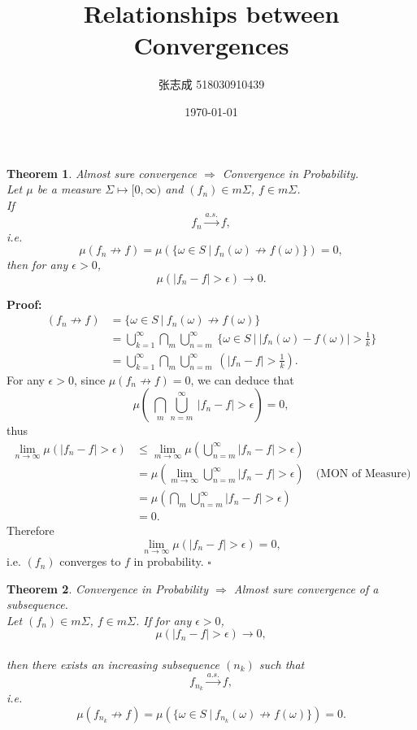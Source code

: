 \documentclass[UTF8, 12pt]{article}
\title{Relationships between Convergences}
\author{张志成 518030910439}
\date{\today}
\newenvironment{proof}{\noindent\ignorespaces\textbf{Proof:}}{\hfill $\square$\par\noindent}
\newtheorem{theorem}{Theorem}
\begin{document}
    \maketitle

    \begin{theorem}
        Almost sure convergence $\Longrightarrow$ Convergence in Probability. \\
        Let $\mu$ be a measure $\Sigma \mapsto [0, \infty)$ and $(f_n) \in m\Sigma$, $f \in m\Sigma$.  \\
        If $$ f_{n} \overset{a.s.}{\longrightarrow} f ,$$ 
        i.e. $$ \mu(f_{n} \not\rightarrow f) = \mu(\{\omega\in S \ |\ f_{n}(\omega) \not\rightarrow f(\omega)\}) = 0, $$ 
        then for any $\epsilon > 0$, $$ \mu(|f_n-f| > \epsilon) \to 0 .$$
    \end{theorem}

    \begin{proof}
        \begin{align*}
            (f_{n} \not\rightarrow f) &= \{\omega\in S \ |\ f_{n}(\omega) \not\rightarrow f(\omega)\} \\
            &= \bigcup_{k=1}^{\infty}\bigcap_{m}\bigcup_{n = m}^{\infty}\ \{\omega \in S \ |\ |f_n(\omega) - f(\omega)| > \frac{1}{k} \} \\
            &= \bigcup_{k=1}^{\infty}\bigcap_{m}\bigcup_{n = m}^{\infty}\ (|f_n- f| > \frac{1}{k}).
        \end{align*}
        For any $\epsilon > 0$,
        since $\mu(f_{n} \not\rightarrow f) = 0$,
        we can deduce that $$ \mu(\ \bigcap_{m}\bigcup_{n = m}^{\infty}\ |f_n- f| > \epsilon) = 0 ,$$ thus
        \begin{align*}
            \lim_{n\to\infty}\mu(|f_n-f| > \epsilon) &\leq \lim_{m\to\infty}\mu(\bigcup_{n = m}^{\infty}  |f_n-f| > \epsilon) \\
            &= \mu(\lim_{m\to\infty}\bigcup_{n = m}^{\infty}  |f_n-f| > \epsilon)\quad \text{(MON of Measure)}\\
            &= \mu(\bigcap_{m}\bigcup_{n = m}^{\infty}  |f_n-f| > \epsilon) \\
            &= 0.
        \end{align*}
        Therefore $$ \lim_{n\to\infty}\mu(|f_n-f| > \epsilon) = 0 ,$$ i.e. $(f_n)$ converges to $f$ in probability.
    \end{proof}

    \begin{theorem}
        Convergence in Probability $\Longrightarrow$ Almost sure convergence of a subsequence. \\
        Let $(f_n) \in m\Sigma$, $f \in m\Sigma$. If for any $\epsilon > 0$, $$ \mu(|f_n-f| > \epsilon) \to 0 ,$$ \\
        then there exists an increasing subsequence $(n_k)$ such that $$ f_{n_k} \overset{a.s.}{\longrightarrow} f ,$$ 
        i.e. $$ \mu(f_{n_k} \not\rightarrow f) = \mu(\{\omega\in S \ |\ f_{n_k}(\omega) \not\rightarrow f(\omega)\}) = 0. $$ 
    \end{theorem}
\end{document}

